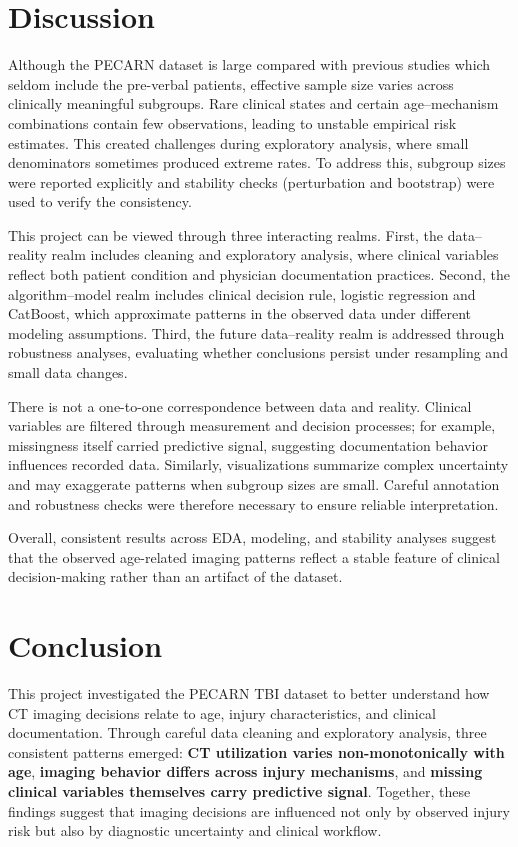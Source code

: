 \documentclass[10pt,letterpaper]{article}
\begin{document}
\section{Discussion}\label{discussion}

Although the PECARN dataset is large compared with previous studies which seldom include the pre-verbal patients, effective sample size varies across clinically meaningful subgroups. Rare clinical states and certain age–mechanism combinations contain few observations, leading to unstable empirical risk estimates. This created challenges during exploratory analysis, where small denominators sometimes produced extreme rates. To address this, subgroup sizes were reported explicitly and stability checks (perturbation and bootstrap) were used to verify the consistency.

This project can be viewed through three interacting realms. First, the data–reality realm includes cleaning and exploratory analysis, where clinical variables reflect both patient condition and physician documentation practices. Second, the algorithm–model realm includes clinical decision rule, logistic regression and CatBoost, which approximate patterns in the observed data under different modeling assumptions. Third, the future data–reality realm is addressed through robustness analyses, evaluating whether conclusions persist under resampling and small data changes.

There is not a one-to-one correspondence between data and reality. Clinical variables are filtered through measurement and decision processes; for example, missingness itself carried predictive signal, suggesting documentation behavior influences recorded data. Similarly, visualizations summarize complex uncertainty and may exaggerate patterns when subgroup sizes are small. Careful annotation and robustness checks were therefore necessary to ensure reliable interpretation.

Overall, consistent results across EDA, modeling, and stability analyses suggest that the observed age-related imaging patterns reflect a stable feature of clinical decision-making rather than an artifact of the dataset.

\section{Conclusion}\label{conclusion}


This project investigated the PECARN TBI dataset to better understand how CT imaging decisions relate to age, injury characteristics, and clinical documentation. Through careful data cleaning and exploratory analysis, three consistent patterns emerged: \textbf{CT utilization varies non-monotonically with age}, \textbf{imaging behavior differs across injury mechanisms}, and \textbf{missing clinical variables themselves carry predictive signal}. Together, these findings suggest that imaging decisions are influenced not only by observed injury risk but also by diagnostic uncertainty and clinical workflow.
\end{document}
